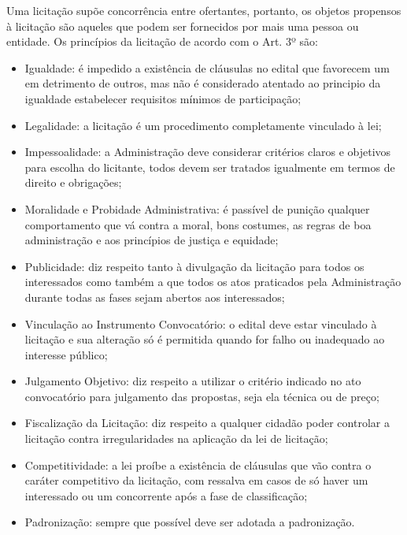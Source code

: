 Uma licitação supõe concorrência entre ofertantes, portanto, os objetos propensos à licitação são aqueles que podem ser fornecidos por mais uma pessoa ou entidade. Os princípios da licitação de acordo com o Art. 3º são:
\begin{itemize}
\item Igualdade: é impedido a existência de cláusulas no edital que favorecem um em detrimento de outros, mas não é considerado atentado ao principio da igualdade estabelecer requisitos mínimos de participação;
\item Legalidade:  a licitação é um procedimento completamente vinculado à lei;
\item Impessoalidade: a Administração deve considerar critérios claros e objetivos para escolha do licitante, todos devem ser tratados igualmente em termos de direito e obrigações;
\item Moralidade e Probidade Administrativa: é passível de punição qualquer comportamento que vá contra a moral, bons costumes, as regras de boa administração e aos princípios de justiça e equidade;
\item Publicidade:  diz respeito tanto à divulgação da licitação para todos os interessados como também a que todos os atos praticados pela Administração durante todas as fases sejam abertos aos interessados;
\item Vinculação ao Instrumento Convocatório: o edital deve estar vinculado à licitação e sua alteração só é permitida quando for falho ou inadequado ao interesse público;
\item Julgamento Objetivo:  diz respeito a utilizar o critério indicado no ato convocatório para julgamento das propostas, seja ela técnica ou de preço;
\item Fiscalização da Licitação: diz respeito a qualquer cidadão poder controlar a licitação contra irregularidades na aplicação da lei de licitação;
\item Competitividade: a lei proíbe a existência de cláusulas que vão contra o caráter competitivo da licitação, com ressalva em casos de só haver um interessado ou um concorrente após a fase de classificação;
\item Padronização: sempre que possível deve ser adotada a padronização.
\end{itemize}

